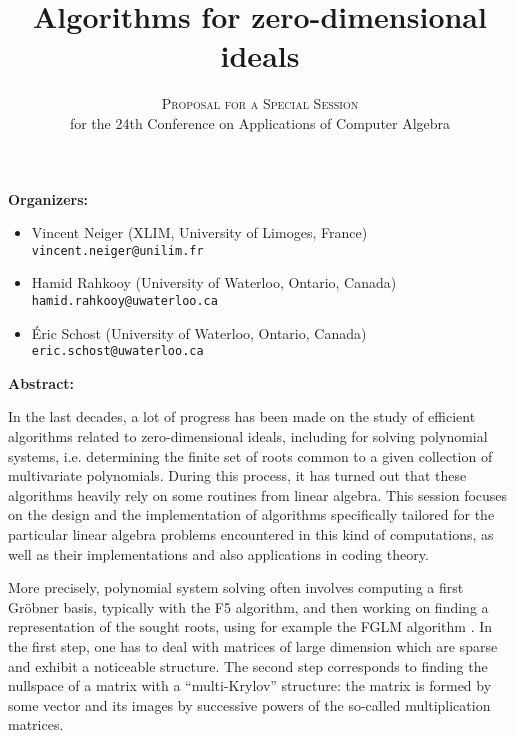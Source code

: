 \documentclass[12pt,english]{article}
\title{Algorithms for zero-dimensional ideals}
\author{\textsc{Proposal for a Special Session} \\
  for the 24th Conference on Applications of Computer Algebra}
\date{}
\begin{document}
\maketitle

\textbf{Organizers:}
\begin{itemize}
  \item Vincent Neiger (XLIM, University of Limoges, France) \\
    {\small \verb+vincent.neiger@unilim.fr+}
  \item Hamid Rahkooy (University of Waterloo, Ontario, Canada) \\
    {\small \verb+hamid.rahkooy@uwaterloo.ca+}
  \item \'Eric Schost (University of Waterloo, Ontario, Canada) \\
    {\small \texttt{eric.schost@uwaterloo.ca}}
\end{itemize}

\textbf{Abstract:}

In the last decades, a lot of progress has been made on the study of efficient
algorithms related to zero-dimensional ideals, including for solving polynomial
systems, i.e. determining the finite set of roots common to a given collection
of multivariate polynomials.  During this process, it has turned out that these
algorithms heavily rely on some routines from linear algebra.  This
session focuses on the design and the implementation of algorithms specifically
tailored for the particular linear algebra problems encountered in this kind of
computations, as well as their implementations and also applications in coding theory.

More precisely, polynomial system solving often involves computing a first
Gr\"obner basis, typically with the F5 algorithm, and then working on finding a
representation of the sought roots, using for example the FGLM algorithm
\cite{FaGiLaMo93}.  In the first step, one has to deal with matrices of large
dimension which are sparse and exhibit a noticeable structure.  The second step
corresponds to finding the nullspace of a matrix with a ``multi-Krylov''
structure: the matrix is formed by some vector and its images by successive
powers of the so-called multiplication matrices.
\end{document}
